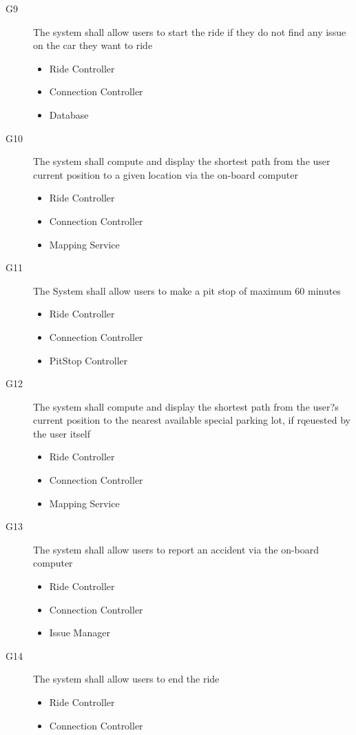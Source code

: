 \documentclass{article}
\begin{document}
\begin{flushleft}
\begin{description}
\item [G9] The system shall allow users to start the ride if they do not find any issue on the car they want to ride
\begin{itemize}
\item Ride Controller
\item Connection Controller
\item Database
\end{itemize}



\item[G10] The system shall compute and display the shortest path from the user current position to a given location via the on-board computer
\begin{itemize}
\item Ride Controller
\item Connection Controller
\item Mapping Service
\end{itemize}

\item [G11] The System shall allow users to make a pit stop of maximum 60 minutes
\begin{itemize}
\item Ride Controller
\item Connection Controller
\item PitStop Controller
\end{itemize}


\item [G12] The system shall compute and display the shortest path from the user?s current position to the nearest available special parking lot, if rqeuested by the user itself
\begin{itemize}
\item Ride Controller
\item Connection Controller
\item Mapping Service
\end{itemize}

\item [G13] The system shall allow users to report an accident via the on-board computer
\begin{itemize}
\item Ride Controller
\item Connection Controller
\item Issue Manager
\end{itemize}

\item [G14] The system shall allow users to end the ride 
\begin{itemize}
\item Ride Controller
\item Connection Controller
\end{itemize}


\end{description}
\end{flushleft}
\end{document}
